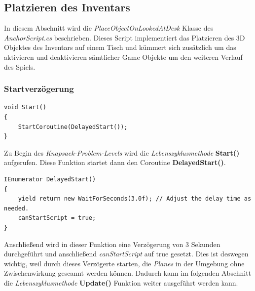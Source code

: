 \subsection{Platzieren des Inventars}
In diesem Abschnitt wird die \textit{PlaceObjectOnLookedAtDesk} Klasse des \textit{AnchorScript.cs} beschrieben. Dieses Script
implementiert das Platzieren des 3D Objektes des Inventars auf einem Tisch und kümmert sich zusätzlich
um das aktivieren und deaktivieren sämtlicher Game Objekte um den weiteren Verlauf des Spiels.

\subsubsection{Startverzögerung}
\begin{lstlisting}[style=csharp, caption={}, label=code:Start]
void Start()
{
    StartCoroutine(DelayedStart());
}
\end{lstlisting}
Zu Begin des \textit{Knapsack-Problem-Levels} wird die \textit{Lebenszyklusmethode} \textbf{Start()} aufgerufen. Diese
Funktion startet dann den Coroutine \textbf{DelayedStart()}.\\

\begin{lstlisting}[style=csharp, caption={}, label=code:DelayedStart]
IEnumerator DelayedStart()
{
    yield return new WaitForSeconds(3.0f); // Adjust the delay time as needed.
    canStartScript = true;
}
\end{lstlisting}
Anschließend wird in dieser Funktion eine Verzögerung von 3 Sekunden durchgeführt und anschließend \textit{canStartScript}
auf true gesetzt. Dies ist deswegen wichtig, weil durch dieses Verzögerte starten, die \textit{Planes} in der Umgebung ohne
Zwischenwirkung gescannt werden können. Dadurch kann im folgenden Abschnitt die \textit{Lebenszyklusmethode} \textbf{Update()}
Funktion weiter ausgeführt werden kann.

